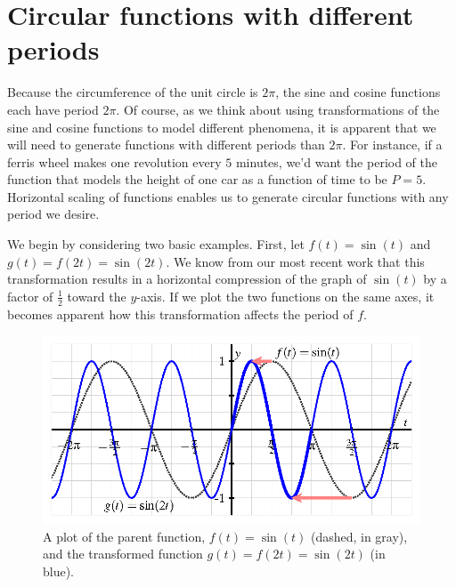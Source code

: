 \documentclass{ximera}
\begin{document}
%
%
%
\section{Circular functions with different periods}

Because the circumference of the unit circle is \(2\pi\), the sine and cosine functions each have period \(2\pi\).  Of course, as we think about using transformations of the sine and cosine functions to model different phenomena, it is apparent that we will need to generate functions with different periods than \(2\pi\).  For instance, if a ferris wheel makes one revolution every \(5\) minutes, we'd want the period of the function that models the height of one car as a function of time to be \(P = 5\).  Horizontal scaling of functions enables us to generate circular functions with any period we desire.%

We begin by considering two basic examples.  First, let \(f(t) = \sin(t)\) and \(g(t) = f(2t) = \sin(2t)\).  We know from our most recent work that this transformation results in a horizontal compression of the graph of \(\sin(t)\) by a factor of \(\frac{1}{2}\) toward the \(y\)-axis.  If we plot the two functions on the same axes, it becomes apparent how this transformation affects the period of \(f\).%
\begin{figure}
\centering
\includegraphics[width=0.75\linewidth]{images/sinusoidal-sine-horiz-scaling.png}
\caption{A plot of the parent function, \(f(t) = \sin(t)\) (dashed, in gray), and the transformed function \(g(t) = f(2t) = \sin(2t)\) (in blue).\label{F-sinusoidal-sine-compressed}}
\end{figure}
\end{document}
